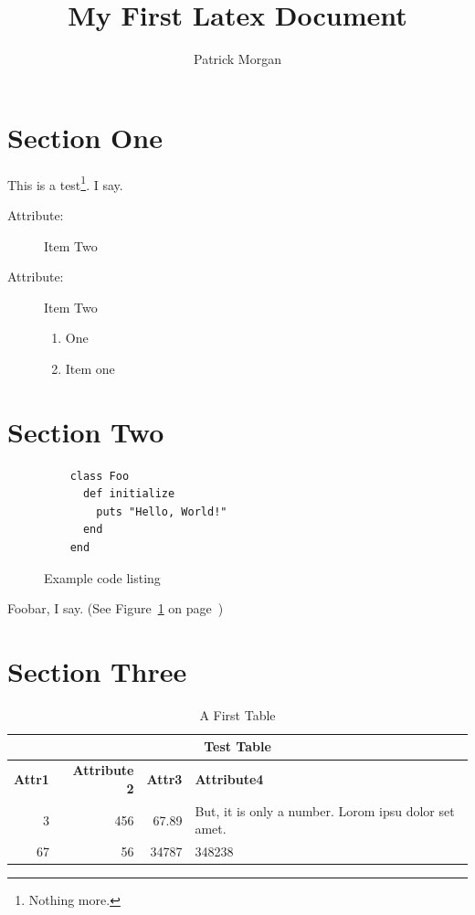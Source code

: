 \documentclass{article}
\begin{document}
\title{My First Latex Document}
\author{Patrick Morgan}

\pagestyle{headings} %
\thispagestyle{plain} %

\maketitle


\section{Section One}

This is a test\footnote{Nothing more.}. I say.

\begin{description}
  \item[Attribute:] Item Two
  \item[Attribute:] Item Two
    \begin{enumerate}
      \item One
      \item Item one
    \end{enumerate}
\end{description}


\section{Section Two}

\begin{figure}
  \begin{verbatim}
    class Foo 
      def initialize
        puts "Hello, World!"
      end
    end
  \end{verbatim}
  \caption{Example code listing}
  \label{code}
\end{figure}

Foobar, I say. (See Figure~\ref{code} on page~\pageref{code})


\section{Section Three}

\begin{table}[H]
  \begin{tabular}{rrrp{6cm}}
    \multicolumn{4}{c}{Test Table} \\
    \hline
    \hline

    \textbf{Attr1 } & \textbf{Attribute 2} & \textbf{Attr3} & \textbf{Attribute4}
    \tabularnewline
    \hline

    3 & 456 & 67.89 & \parbox{5cm}{But, it is only a number.  Lorom ipsu dolor set amet.}
    \tabularnewline

    67 & 56 & 34787 & 348238

  \end{tabular}
  \caption{A First Table}
\end{table}
\end{document}
